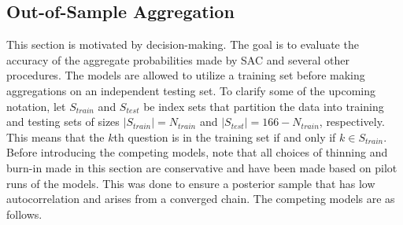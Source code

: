 \documentclass[aoas, preprint]{imsart}
\numberwithin{equation}{section}
\theoremstyle{plain}
\begin{document}
\subsection{Out-of-Sample Aggregation}
\label{forecasting}
This section is motivated by decision-making. 
The goal is to evaluate the accuracy of the aggregate probabilities made by SAC and several other procedures. The models are allowed to utilize a training set before making aggregations on an independent testing set. To clarify some of the upcoming notation, let $S_{train}$ and $S_{test}$ be index sets that partition the data into training and testing sets of sizes $|S_{train}| = N_{train}$ and $|S_{test}| = 166 - N_{train}$, respectively. This means that the $k$th question is in the training set if and only if $k \in S_{train}$.  Before introducing the competing models, note that all choices of thinning and burn-in made in this section are conservative and have been made based on pilot runs of the models.  This was done to ensure a posterior sample that has low autocorrelation and arises from a converged chain. The competing models are as follows.
\end{document}

